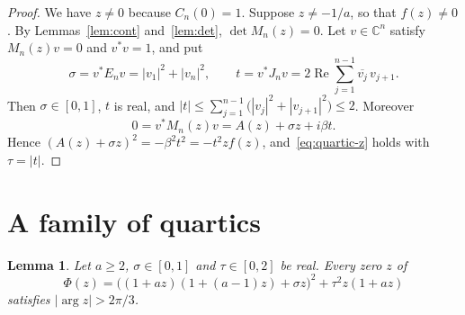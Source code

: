 \documentclass{amsart}
\newtheorem{lemma}[theorem]{Lemma}
\theoremstyle{remark}
\numberwithin{equation}{section}
\newcommand{\C}{\mathbb{C}}
\begin{document}
\begin{proof}
We have $z\ne 0$ because $C_n(0)=1$. Suppose $z\ne -1/a$, so that
$f(z)\ne 0$. By Lemmas~\ref{lem:cont} and~\ref{lem:det}, $\det M_n(z)=0$.
Let $v\in\C^n$ satisfy $M_n(z)v=0$ and $v^*v=1$, and put
\[
\sigma=v^*E_nv=|v_1|^2+|v_n|^2,\qquad
t=v^*J_nv=2\operatorname{Re}\sum_{j=1}^{n-1}\overline{v_j}\,v_{j+1}.
\]
Then $\sigma\in[0,1]$, $t$ is real, and
$|t|\le\sum_{j=1}^{n-1}\bigl(|v_j|^2+|v_{j+1}|^2\bigr)\le 2$. Moreover
\[
0=v^*M_n(z)v=A(z)+\sigma z+i\beta t .
\]
Hence $(A(z)+\sigma z)^2=-\beta^2t^2=-t^2zf(z)$, and~\eqref{eq:quartic-z}
holds with $\tau=|t|$.
\end{proof}

\section{A family of quartics}\label{sec:quartic}

\begin{lemma}\label{lem:quartic}
Let $a\ge 2$, $\sigma\in[0,1]$ and $\tau\in[0,2]$ be real. Every zero $z$
of
\[
\Phi(z)=\bigl((1+az)(1+(a-1)z)+\sigma z\bigr)^2+\tau^2z(1+az)
\]
satisfies $|\arg z|>2\pi/3$.
\end{lemma}
\end{document}
